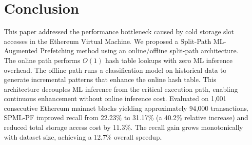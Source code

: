 \documentclass[conference]{IEEEtran}
\begin{document}




\section{Conclusion}
\label{sec:conclusion}

This paper addressed the performance bottleneck caused by cold storage slot accesses in the Ethereum Virtual Machine. We proposed a Split-Path ML-Augmented Prefetching method using an online/offline split-path architecture. The online path performs $O(1)$ hash table lookups with zero ML inference overhead. The offline path runs a classification model on historical data to generate incremental patterns that enhance the online hash table. This architecture decouples ML inference from the critical execution path, enabling continuous enhancement without online inference cost. Evaluated on 1,001 consecutive Ethereum mainnet blocks yielding approximately 94,000 transactions, SPML-PF improved recall from 22.23\% to 31.17\% (a 40.2\% relative increase) and reduced total storage access cost by 11.3\%. The recall gain grows monotonically with dataset size, achieving a 12.7\% overall speedup.






\vspace{12pt}
\end{document}
